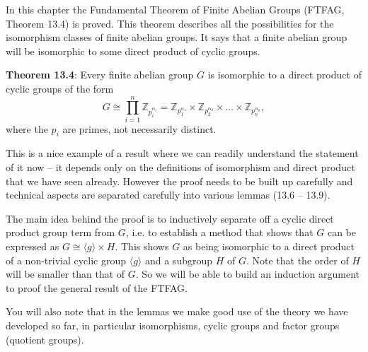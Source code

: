 \documentclass[oneside,10pt]{amsart}
\begin{document}
\vskip 16pt

In this chapter the Fundamental Theorem of Finite Abelian Groups (FTFAG, Theorem 13.4) is proved. This theorem describes all the possibilities for the isomorphism classes of finite abelian groups. It says that a finite abelian group will be isomorphic to some direct product of cyclic groups.
\vskip 0.3cm

\textbf{Theorem 13.4}: Every finite abelian group $G$ is isomorphic to a direct product of cyclic groups of the form
$$G \cong \prod_{i=1}^n \mathbb{Z}_{p_i^{\alpha_i}}
= \mathbb{Z}_{p_1^{\alpha_1}} \times \mathbb{Z}_{p_2^{\alpha_2}} \times \dots \times \mathbb{Z}_{p_n^{\alpha_n}},$$
where the $p_i$ are primes, not necessarily distinct.
\vskip 0.3cm

This is a nice example of a result where we can readily understand the statement of it now -- it depends only on the definitions of isomorphism and direct product that we have seen already. However the proof needs to be built up carefully and technical aspects are separated carefully into various lemmas (13.6 -- 13.9).
\vskip 0.3cm

The main idea behind the proof is to inductively separate off a cyclic direct product group term from $G$, i.e. to establish a method that shows that $G$ can be expressed as $G \cong \langle g \rangle \times H$. This shows $G$ as being isomorphic to a direct product of a non-trivial cyclic group $\langle g \rangle$ and a subgroup $H$ of $G$. Note that the order of $H$ will be smaller than that of $G$. So we will be able to build an induction argument to proof the general result of the FTFAG.
\vskip 0.3cm

You will also note that in the lemmas we make good use of the theory we have developed so far, in particular isomorphisms, cyclic groups and factor groups (quotient groups).
\end{document}

